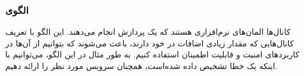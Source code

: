 \subsubsection{الگوی }
\label{safeChannelSec}
\begin{RTL}
کانال‌ها المان‌های نرم‌افزاری هستند که یک پردازش  انجام
می‌دهند. این الگو با تعریف کانال‌هایی که مقدار زیادی اضافات در خود
دارند، باعث می‌شوند که بتوانیم از آن‌ها در کاربردهای امنیت و قابلیت
اطمینان استفاده کنیم. به طور مثال در این الگو، می‌توانیم با اینکه
یک خطا تشخیص داده شده‌است، همچنان سرویس مورد نظر را ارائه دهیم.
\end{RTL}